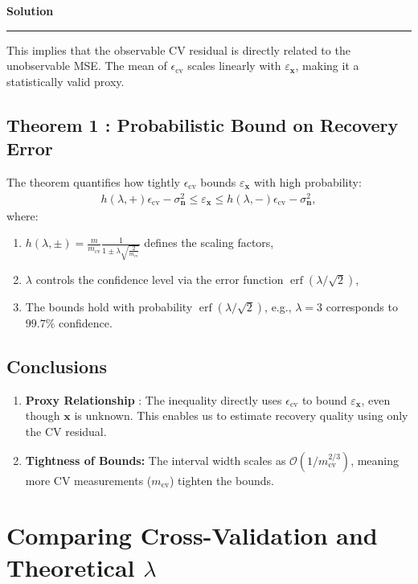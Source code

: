 \documentclass[a4paper,12pt]{article}
\newenvironment{solution}[2][]{%
    \begin{mdframed}[linecolor=blue!70!black, linewidth=2pt, roundcorner=10pt, backgroundcolor=yellow!10!white, skipabove=12pt, skipbelow=12pt]%
        \textbf{\large #2}
        \par\noindent\rule{\textwidth}{0.4pt}
}{
    \end{mdframed}
}
\begin{document}
\begin{solution}{Solution}
  \noindent This implies that the observable CV residual is directly related to the unobservable MSE. The mean of $\epsilon_{\text{cv}}$ scales linearly with $\varepsilon_{\mathbf{x}}$, making it a statistically valid proxy.

  \subsection{Theorem 1 : Probabilistic Bound on Recovery Error}

  The theorem quantifies how tightly $\epsilon_{\text{cv}}$ bounds $\varepsilon_{\mathbf{x}}$ with high probability:
  \begin{align*}
    h(\lambda,+) \epsilon_{\text{cv}} - \sigma_{\mathbf{n}}^2 \leq \varepsilon_{\mathbf{x}} \leq h(\lambda,-) \epsilon_{\text{cv}} - \sigma_{\mathbf{n}}^2,
  \end{align*}
  where:
  \begin{enumerate}
      \item $h(\lambda, \pm) = \displaystyle\frac{m}{m_{\text{cv}}} \displaystyle\frac{1}{1 \pm \lambda \sqrt{\displaystyle\frac{2}{m_{\text{cv}}}}}$ defines the scaling factors,
      \item $\lambda$ controls the confidence level via the error function $\operatorname{erf}(\lambda/\sqrt{2})$,
      \item The bounds hold with probability $\operatorname{erf}(\lambda/\sqrt{2})$, e.g., $\lambda = 3$ corresponds to $99.7\%$ confidence.
  \end{enumerate}

  \subsection{Conclusions}

  \begin{enumerate}
    \item \textbf{Proxy Relationship} : The inequality directly uses $\epsilon_{\text{cv}}$ to bound $\varepsilon_{\mathbf{x}}$, even though $\mathbf{x}$ is unknown. This enables us to estimate recovery quality using only the CV residual.
    \item \textbf{Tightness of Bounds:} The interval width scales as $\mathcal{O}(1/m_{\text{cv}}^{2/3})$, meaning more CV measurements ($m_{\text{cv}}$) tighten the bounds.
  \end{enumerate}

  

  \section{Comparing Cross-Validation and Theoretical $\lambda$}


\end{solution}
\end{document}
